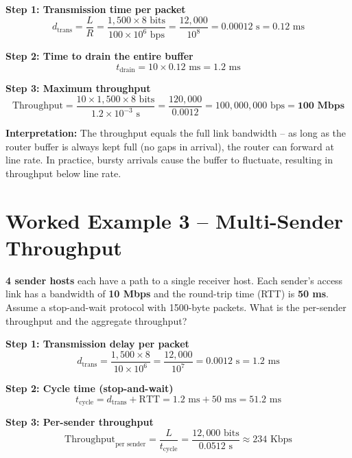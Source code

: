 \documentclass[11pt, letterpaper]{article}
\begin{document}
\textbf{Step 1: Transmission time per packet}
\[
  d_{\text{trans}} = \frac{L}{R} = \frac{1{,}500 \times 8 \text{ bits}}{100 \times 10^6 \text{ bps}} = \frac{12{,}000}{10^8} = 0.00012 \text{ s} = 0.12 \text{ ms}
\]

\textbf{Step 2: Time to drain the entire buffer}
\[
  t_{\text{drain}} = 10 \times 0.12 \text{ ms} = 1.2 \text{ ms}
\]

\textbf{Step 3: Maximum throughput}
\[
  \text{Throughput} = \frac{10 \times 1{,}500 \times 8 \text{ bits}}{1.2 \times 10^{-3} \text{ s}} = \frac{120{,}000}{0.0012} = 100{,}000{,}000 \text{ bps} = \textbf{100 Mbps}
\]

\begin{tcolorbox}[colback=part5bg, colframe=sectionteal, arc=3pt, boxrule=1pt]
\textbf{Interpretation:} The throughput equals the full link bandwidth -- as long as the router buffer is always kept full (no gaps in arrival), the router can forward at line rate. In practice, bursty arrivals cause the buffer to fluctuate, resulting in throughput below line rate.
\end{tcolorbox}

\section*{Worked Example 3 -- Multi-Sender Throughput}

\begin{tcolorbox}[colback=part5bg, colframe=sectionteal,
  title={\bfseries Problem}, arc=3pt, boxrule=1pt]
\textbf{4 sender hosts} each have a path to a single receiver host. Each sender's access link has a bandwidth of \textbf{10 Mbps} and the round-trip time (RTT) is \textbf{50 ms}. Assume a stop-and-wait protocol with 1500-byte packets. What is the per-sender throughput and the aggregate throughput?
\end{tcolorbox}

\textbf{Step 1: Transmission delay per packet}
\[
  d_{\text{trans}} = \frac{1{,}500 \times 8}{10 \times 10^6} = \frac{12{,}000}{10^7} = 0.0012 \text{ s} = 1.2 \text{ ms}
\]

\textbf{Step 2: Cycle time (stop-and-wait)}
\[
  t_{\text{cycle}} = d_{\text{trans}} + \text{RTT} = 1.2 \text{ ms} + 50 \text{ ms} = 51.2 \text{ ms}
\]

\textbf{Step 3: Per-sender throughput}
\[
  \text{Throughput}_{\text{per sender}} = \frac{L}{t_{\text{cycle}}} = \frac{12{,}000 \text{ bits}}{0.0512 \text{ s}} \approx 234 \text{ Kbps}
\]
\end{document}
